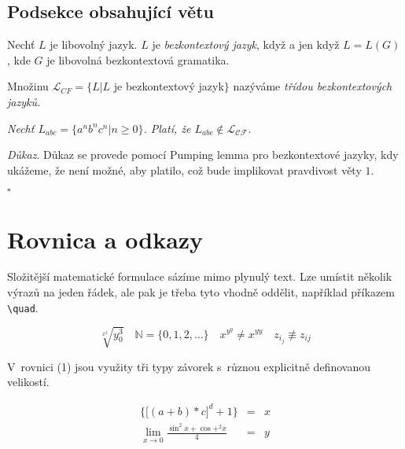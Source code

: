 \documentclass[11pt,a4paper,twocolumn]{article}
\newcommand{\QEDB}{\hfill\ensuremath{\square}}
\begin{document}
	
	\subsection{Podsekce obsahující větu}
	
	\begin{definice}
		Nechť $L$ je libovolný jazyk. $L$ je \textit{bezkontextový jazyk}, když a jen když $L = L(G)$, kde $G$ je libovolná bezkontextová gramatika.
	\end{definice}
	
	
	\begin{definice}
		Množinu $\mathcal{L}_{CF} = \{L$$\mid$$L$ je bezkontextový jazyk$\}$ nazýváme \textit{třídou bezkontextových jazyků.}
	\end{definice}
	
	\begin{veta}
		\textit{Nechť $L_{abc} = \{a^n b^n c^n$$\mid$$n \geq 0 \}$. Platí, že $L_{abc} \notin \mathcal{L_{CF}}$}.
	\end{veta}
	
	{\raggedright
	\textit{Důkaz}. Důkaz se provede pomocí Pumping lemma pro bezkontextové jazyky, kdy ukážeme, že není možné, aby platilo, což bude implikovat pravdivost věty $1$.} \QEDB
	
	\section{Rovnica a odkazy}
	
	Složitější matematické formulace sázíme mimo plynulý text. Lze umístit několik výrazů na jeden řádek, ale pak je třeba tyto vhodně oddělit, například příkazem \verb+\quad+. 
	
	\large
	$$\sqrt[x^2]{y^3_0} \quad \mathbb{N} = \{0, 1, 2, \ldots\} \quad x^{y^y} \neq x^{yy} \quad z_{i_j} \not\equiv z_{ij}$$
	
	\normalsize
	
	V~rovnici (1) jsou využity tři typy závorek s~různou explicitně definovanou velikostí.
	
	\begin{eqnarray}
		\bigg\{ \Big[(a + b) * c\Big]^d + 1 \bigg\} & = & x \\
		\lim\limits_{x\to0} \frac{\sin^2 x + \cos+^2 x}{4} & = & y \nonumber
	\end{eqnarray}
	
	\normalsize
	
\end{document}
